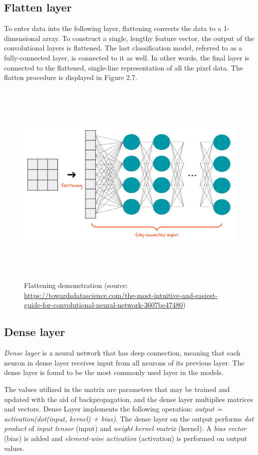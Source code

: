 \subsection{Flatten layer}
\hspace{0.5cm}To enter data into the following layer, flattening converts the data to a 1-dimensional array. To construct a single, lengthy feature vector, the output of the convolutional layers is flattened. The last classification model, referred to as a fully-connected layer, is connected to it as well. In other words, the final layer is connected to the flattened, single-line representation of all the pixel data. The flatten procedure is displayed in Figure 2.7.
\begin{figure}[!h]
	\centering
	\includegraphics[width=\linewidth, height=10cm,keepaspectratio]{figures/flattening.png}
   \caption{Flattening demonstration (source: \url{https://towardsdatascience.com/the-most-intuitive-and-easiest-guide-for-convolutional-neural-network-3607be47480})}
\end{figure}
\subsection{Dense layer}
\hspace{0.5cm}\emph{Dense layer} is a neural network that has deep connection, meaning that each neuron in dense layer receives input from all neurons of its previous layer. The dense layer is found to be the most commonly used layer in the models.

The values utilized in the matrix are parameters that may be trained and updated with the aid of backpropagation, and the dense layer multiplies matrices and vectors. Dense Layer implements the following operation: \textit{output = activation(dot(input, kernel) + bias)}. The dense layer on the output performs \textit{dot product} of \textit{input tensor} (input) and \textit{weight kernel matrix} (kernel). A \textit{bias vector} (bias) is added and \textit{element-wise activation} (activation) is performed on output values. 

